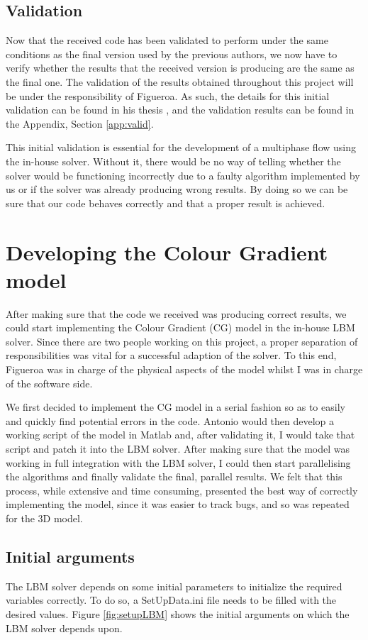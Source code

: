 \documentclass[12pt, openany]{book}
\begin{document}
\subsection{Validation}
Now that the received code has been validated to perform under the same conditions as the final version used by the previous authors, we now have to verify whether the results that the received version is producing are the same as the final one. The validation of the results obtained throughout this project will be under the responsibility of Figueroa. As such, the details for this initial validation can be found in his thesis \cite{antonioThesis}, and the validation results can be found in the Appendix, Section \ref{app:valid}.
\par This initial validation is essential for the development of a multiphase flow using the in-house solver. Without it, there would be no way of telling whether the solver would be functioning incorrectly due to a faulty algorithm implemented by us or if the solver was already producing wrong results. By doing so we can be sure that our code behaves correctly and that a proper result is achieved.

\section{Developing the Colour Gradient model}
After making sure that the code we received was producing correct results, we could start implementing the Colour Gradient (CG) model in the in-house LBM solver. Since there are two people working on this project, a proper separation of responsibilities  was vital for a successful adaption of the solver. To this end, Figueroa \cite{antonioThesis} was in charge of the physical aspects of the model whilst I was in charge of the software side. \par
We first decided to implement the CG model in a serial fashion so as to easily and quickly find potential errors in the code. Antonio would then develop a working script of the model in Matlab and, after validating it, I would take that script and patch it into the LBM solver. After making sure that the model was working in full integration with the LBM solver, I could then start parallelising the algorithms and finally validate the final, parallel results. We felt that this process, while extensive and time consuming, presented the best way of correctly implementing the model, since it was easier to track bugs, and so was repeated for the 3D model.
\subsection{Initial arguments}
The LBM solver depends on some initial parameters to initialize the required variables correctly. To do so, a SetUpData.ini file needs to be filled with the desired values. Figure \ref{fig:setupLBM} shows the initial arguments on which the LBM solver depends upon.
\end{document}
